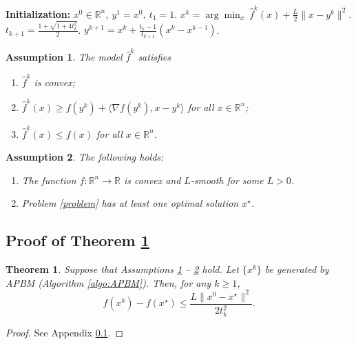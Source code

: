 \documentclass[10pt,a4paper]{amsart}
\newtheorem{assumption}{Assumption}
\newtheorem{theorem}{Theorem}
\newcommand{\R}{{\mathbb{R}}}
\begin{document}
 \begin{algorithm}[t]
\caption{Accelerated Proximal Bundle Method (APBM)}\label{algo:APBM}
\begin{algorithmic}[1]
\State \textbf{Initialization:} $x^0 \in \mathbb{R}^n,~y^1 = x^0,~t_1=1$. 
\vspace{0.2cm}
\State $x^k = \arg\min_x ~\hat{f}^k(x)+ \frac{L}{2}\|x-y^k\|^2$.
\vspace{0.2cm}
\State $t_{k+1} = \frac{1+ \sqrt{1+4t_k^2}}{2}$.
\vspace{0.2cm}
\State $ y^{k+1} = x^k  + \frac{t_k-1}{t_{k+1}}(x^k-x^{k-1})$.
\vspace{0.2cm}
\EndFor
\end{algorithmic}
\end{algorithm}

\begin{assumption}\label{asm:pri_model}
    The model $\hat{f}^k$ satisfies
    \begin{enumerate}[label=(\alph*)]
    \item $\hat{f}^k$ is convex;\label{primal model assumption a}
    \item $\hat {f}^k(x) \geq f(y^k) + \langle \nabla f(y^k),x-y^k\rangle$ for all $x\in\R^n$;\label{primal model assumption b}
    \item $\hat{f}^k(x)\leq f(x)$ for all $x\in\R^n$.\label{primal model assumption c}
    \end{enumerate}
\end{assumption}

\begin{assumption}\label{asm:prob}
The following holds:
     \begin{enumerate}[label=(\alph*)]
     \item The function $f: \mathbb{R}^n \rightarrow \mathbb{R}$ is convex and $L$-smooth for some $L>0$.
     \item Problem \eqref{problem} has at least one optimal solution $x^\star$.
    \end{enumerate}
\end{assumption}

\subsection{Proof of Theorem \ref{theo:sublinear}}\label{appe:theo1}

\begin{theorem}\label{theo:sublinear}
     Suppose that Assumptions \ref{asm:pri_model} -- \ref{asm:prob}  hold. Let $\{x^k\}$ be generated by APBM (Algorithm \ref{algo:APBM}). Then, for any $k\geq 1$,
     \begin{equation}\label{eq:result-tk}
         f(x^{k}) -f(x^\star) \leq \frac{L\|x^0-x^\star\|^2}{2t_{k}^2}.
     \end{equation}
\end{theorem}

\begin{proof}
    See Appendix \ref{appe:theo1}.
\end{proof}
\end{document}
